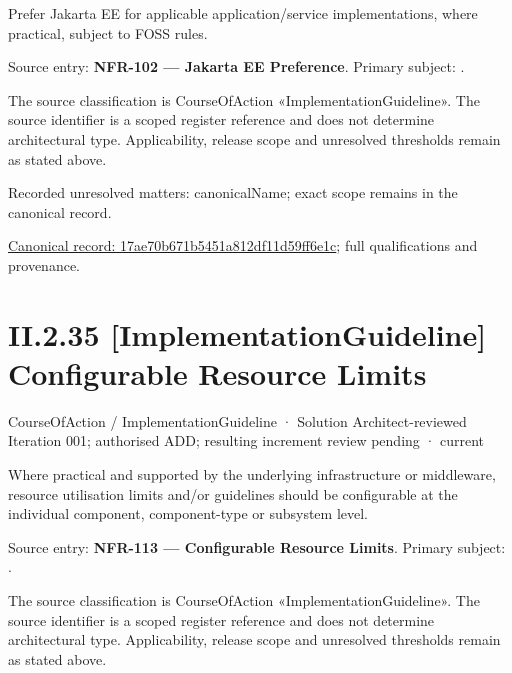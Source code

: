 Prefer Jakarta EE for applicable application/service implementations, where practical, subject to FOSS rules.



Source entry: \textbf{NFR-102 — Jakarta EE Preference}. Primary subject: \texttt{}.



The source classification is CourseOfAction «ImplementationGuideline». The source identifier is a scoped register reference and does not determine architectural type. Applicability, release scope and unresolved thresholds remain as stated above.


{\small Recorded unresolved matters: canonicalName; exact scope remains in the canonical record.}\par
{\footnotesize \href{../../../../continuum/strategy/course-of-action/implementation-guideline/17ae70b671b5451a812df11d59ff6e1c.md}{Canonical record: 17ae70b671b5451a812df11d59ff6e1c}; full qualifications and provenance.}\par
\section*{II.2.35 [ImplementationGuideline] Configurable Resource Limits}
\label{navigation:II.2.35}

\label{element:4621a5cb0dbe445488439ac03398a8b5}
{\small CourseOfAction / ImplementationGuideline · Solution Architect-reviewed Iteration 001; authorised ADD; resulting increment review pending · current}\par

Where practical and supported by the underlying infrastructure or middleware, resource utilisation limits and/or guidelines should be configurable at the individual component, component-type or subsystem level.



Source entry: \textbf{NFR-113 — Configurable Resource Limits}. Primary subject: \texttt{}.



The source classification is CourseOfAction «ImplementationGuideline». The source identifier is a scoped register reference and does not determine architectural type. Applicability, release scope and unresolved thresholds remain as stated above.


